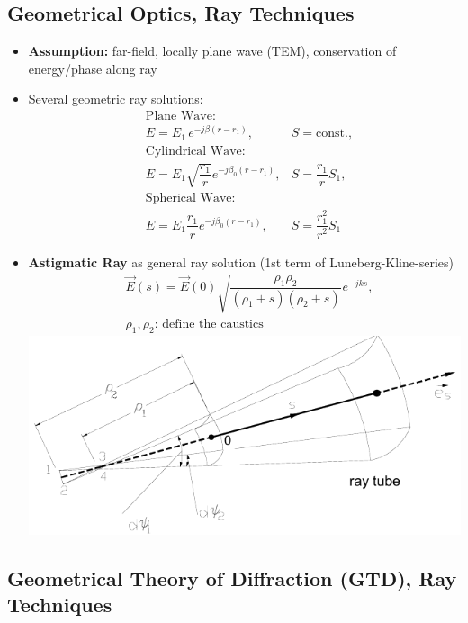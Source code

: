 \subsection{Geometrical Optics, Ray Techniques}
\begin{itemize}
    \itemsep0pt
    \item \textbf{Assumption:} far-field, locally plane wave (TEM), conservation of energy/phase along ray
    \item Several geometric ray solutions:
    \begin{align*}
        &\text{Plane Wave:}\\
        &E = E_1\,e^{-j\beta(r-r_1)}, &S = \mathrm{const.},\\
        &\text{Cylindrical Wave:}\\
        &E = E_1 \sqrt{\dfrac{r_1}{r}} e^{-j\beta_0(r - r_1)}, &S = \dfrac{r_1}{r}S_1,\\
        &\text{Spherical Wave:}\\
        &E = E_1 \dfrac{r_1}{r} e^{-j\beta_0(r - r_1)}, &S = \dfrac{r_1^2}{r^2}S_1
    \end{align*}
    \item \textbf{Astigmatic Ray} as general ray solution (1st term of Luneberg-Kline-series)
        \begin{align*}
            &\vec{E}(s) = \vec{E}(0) \sqrt{\dfrac{\rho_1\rho_2}{(\rho_1 + s)(\rho_2 + s)}} e^{-jks},\\
            &\rho_1,\rho_2\text{: define the caustics}
        \end{align*}
        \includegraphics[width=.3\paperheight]{content/aawp/pictures/astigmatic_ray.png}
\end{itemize}

\subsection{Geometrical Theory of Diffraction (GTD), Ray Techniques}
